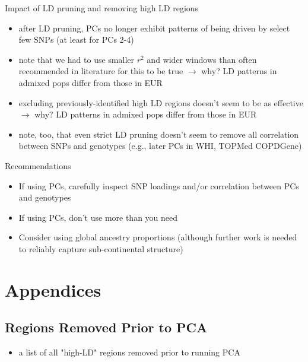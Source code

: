 \documentclass[12pt]{article}
\begin{document}
\noindent Impact of LD pruning and removing high LD regions
\begin{itemize}
\item after LD pruning, PCs no longer exhibit patterns of being driven by select few SNPs (at least for PCs 2-4)
\item note that we had to use smaller $r^2$ and wider windows than often recommended in literature for this to be true $\rightarrow$ why? LD patterns in admixed pops differ from those in EUR
\item excluding previously-identified high LD regions doesn't seem to be as effective $\rightarrow$ why? LD patterns in admixed pops differ from those in EUR
\item note, too, that even strict LD pruning doesn't seem to remove all correlation between SNPs and genotypes (e.g., later PCs in WHI, TOPMed COPDGene)
\end{itemize}

\noindent Recommendations
\begin{itemize}
\item If using PCs, carefully inspect SNP loadings and/or correlation between PCs and genotypes
\item If using PCs, don't use more than you need
\item Consider using global ancestry proportions (although further work is needed to reliably capture sub-continental structure)
\end{itemize}







\newpage
\section{Appendices}


\subsection{Regions Removed Prior to PCA}

\begin{itemize}
\item a list of all "high-LD" regions removed prior to running PCA
\end{itemize}
\end{document}
